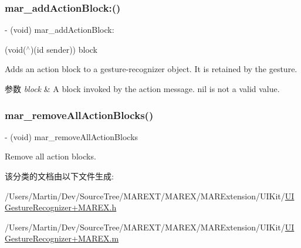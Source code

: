 \subsubsection{\texorpdfstring{mar\+\_\+add\+Action\+Block\+:()}{mar\_addActionBlock:()}}
{\footnotesize\ttfamily -\/ (void) mar\+\_\+add\+Action\+Block\+: \begin{DoxyParamCaption}\item[{(void($^\wedge$)(id sender))}]{block }\end{DoxyParamCaption}}

Adds an action block to a gesture-\/recognizer object. It is retained by the gesture.


\begin{DoxyParams}{参数}
{\em block} & A block invoked by the action message. nil is not a valid value. \\
\hline
\end{DoxyParams}
\mbox{\label{category_u_i_gesture_recognizer_07_m_a_r_e_x_08_a3c4dd9de6912147a75e39e0afd2ecc0f}} 
\subsubsection{\texorpdfstring{mar\+\_\+remove\+All\+Action\+Blocks()}{mar\_removeAllActionBlocks()}}
{\footnotesize\ttfamily -\/ (void) mar\+\_\+remove\+All\+Action\+Blocks \begin{DoxyParamCaption}{ }\end{DoxyParamCaption}}

Remove all action blocks. 

该分类的文档由以下文件生成\+:\begin{DoxyCompactItemize}
\item 
/\+Users/\+Martin/\+Dev/\+Source\+Tree/\+M\+A\+R\+E\+X\+T/\+M\+A\+R\+E\+X/\+M\+A\+R\+Extension/\+U\+I\+Kit/\hyperlink{_u_i_gesture_recognizer_09_m_a_r_e_x_8h}{U\+I\+Gesture\+Recognizer+\+M\+A\+R\+E\+X.\+h}\item 
/\+Users/\+Martin/\+Dev/\+Source\+Tree/\+M\+A\+R\+E\+X\+T/\+M\+A\+R\+E\+X/\+M\+A\+R\+Extension/\+U\+I\+Kit/\hyperlink{_u_i_gesture_recognizer_09_m_a_r_e_x_8m}{U\+I\+Gesture\+Recognizer+\+M\+A\+R\+E\+X.\+m}\end{DoxyCompactItemize}
